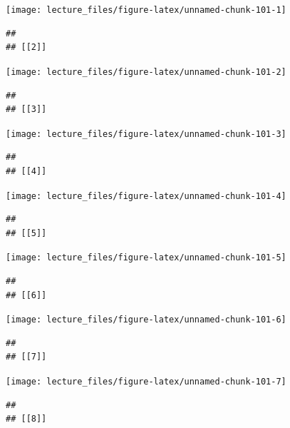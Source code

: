 \documentclass[
]{book}
\begin{document}
\begin{center}\texttt{[image: lecture\_files/figure-latex/unnamed-chunk-101-1]} \end{center}

\begin{verbatim}
## 
## [[2]]
\end{verbatim}

\begin{center}\texttt{[image: lecture\_files/figure-latex/unnamed-chunk-101-2]} \end{center}

\begin{verbatim}
## 
## [[3]]
\end{verbatim}

\begin{center}\texttt{[image: lecture\_files/figure-latex/unnamed-chunk-101-3]} \end{center}

\begin{verbatim}
## 
## [[4]]
\end{verbatim}

\begin{center}\texttt{[image: lecture\_files/figure-latex/unnamed-chunk-101-4]} \end{center}

\begin{verbatim}
## 
## [[5]]
\end{verbatim}

\begin{center}\texttt{[image: lecture\_files/figure-latex/unnamed-chunk-101-5]} \end{center}

\begin{verbatim}
## 
## [[6]]
\end{verbatim}

\begin{center}\texttt{[image: lecture\_files/figure-latex/unnamed-chunk-101-6]} \end{center}

\begin{verbatim}
## 
## [[7]]
\end{verbatim}

\begin{center}\texttt{[image: lecture\_files/figure-latex/unnamed-chunk-101-7]} \end{center}

\begin{verbatim}
## 
## [[8]]
\end{verbatim}
\end{document}
